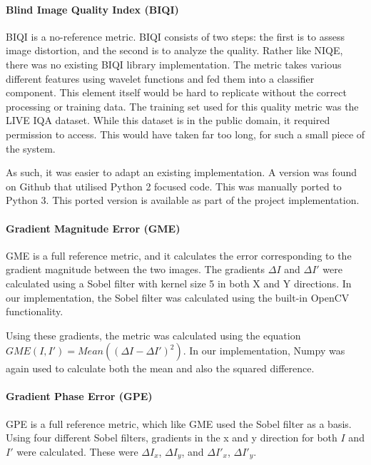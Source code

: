 \documentclass[12pt,a4paper]{article}
\begin{document}
            \paragraph{Blind Image Quality Index (BIQI)}
                BIQI is a no-reference metric. BIQI consists of two steps: the first is to assess image distortion, and the second is to analyze the quality.  Rather like NIQE, there was no existing BIQI library implementation. The metric takes various different features using wavelet functions and fed them into a classifier component. This element itself would be hard to replicate without the correct processing or training data. The training set used for this quality metric was the LIVE IQA dataset. While this dataset is in the public domain, it required permission to access. This would have taken far too long, for such a small piece of the system.

                As such, it was easier to adapt an existing implementation. A version was found on Github that utilised Python 2 focused code. This was manually ported to Python 3. \cite{BIQIImplementation} This ported version is available as part of the project implementation.

            \paragraph{Gradient Magnitude Error (GME)}
            GME is a full reference metric, and it calculates the error corresponding to the gradient magnitude between the two images. The gradients $\Delta I$ and $\Delta I'$
            were calculated using a Sobel filter with kernel size 5 in both X and Y directions. In our implementation, the Sobel filter was calculated using the built-in OpenCV functionality.

                Using these gradients, the metric was calculated using the equation $GME(I, I') = Mean((\Delta I - \Delta I')^2)$. In our implementation, Numpy was again used to calculate both the mean and
                also the squared difference.

            \paragraph{Gradient Phase Error (GPE)}
                GPE is a full reference metric, which like GME used the Sobel filter as a basis. Using four different Sobel filters, gradients in the x and y direction for both
                $I$ and $I'$ were calculated. These were $\Delta I_x$, $\Delta I_y$, and $\Delta I'_x$, $\Delta I'_y$.
\end{document}
